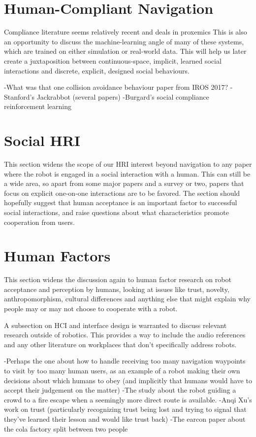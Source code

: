 \documentclass{sfuthesis}
\begin{document}
\section{Human-Compliant Navigation}

Compliance literature seems relatively recent and deals in proxemics This is also an opportunity to discuss the machine-learning angle of many of these systems, which are trained on either simulation or real-world data. This will help us later create a juxtaposition between continuous-space, implicit, learned social interactions and discrete, explicit, designed social behaviours.

-What was that one collision avoidance behaviour paper from IROS 2017?
-Stanford's Jackrabbot (several papers)
-Burgard's social compliance reinforcement learning

\section{Social HRI}

This section widens the scope of our HRI interest beyond navigation to any paper where the robot is engaged in a social interaction with a human. This can still be a wide area, so apart from some major papers and a survey or two, papers that focus on explicit one-on-one interactions are to be favored. The section should hopefully suggest that human acceptance is an important factor to successful social interactions, and raise questions about what characteristics promote cooperation from users.


\section{Human Factors}

This section widens the discussion again to human factor research on robot acceptance and perception by humans, looking at issues like trust, novelty, anthropomorphism, cultural differences and anything else that might explain why people may or may not choose to cooperate with a robot.

A subsection on HCI and interface design is warranted to discuss relevant research outside of robotics. This provides a way to include the audio references and any other literature on workplaces that don't specifically address robots. 


-Perhaps the one about how to handle receiving too many navigation waypoints to visit by too many human users, as an example of a robot making their own decisions about which humans to obey (and implicitly that humans would have to accept their judgement on the matter)
-The study about the robot guiding a crowd to a fire escape when a seemingly more direct route is available.
-Anqi Xu's work on trust (particularly recognizing trust being lost and trying to signal that they've learned their lesson and would like trust back)
-The earcon paper about the cola factory split between two people
\end{document}
